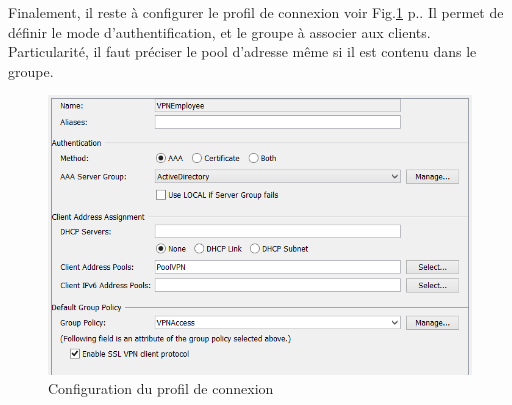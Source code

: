 Finalement, il reste à configurer le profil de connexion voir Fig.\ref{fig:cpCisco} p.\pageref{fig:cpCisco}.
Il permet de définir le mode d'authentification, et le groupe à associer aux clients.
Particularité, il faut préciser le pool d'adresse même si il est contenu dans le groupe.
\begin{figure}[ht]
	\centering
	\includegraphics{Cisco/ConnectionProfile.png}
	\caption{Configuration du profil de connexion}
	\label{fig:cpCisco}
\end{figure} 
